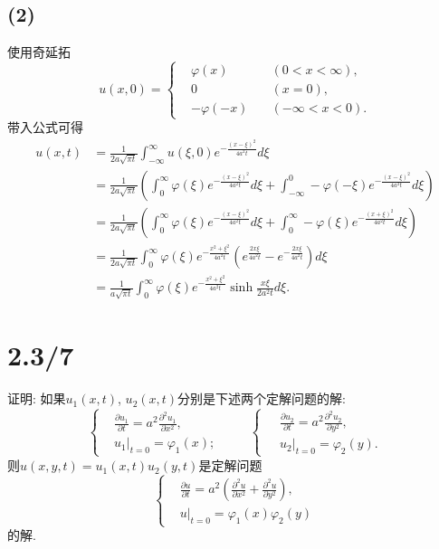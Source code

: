 \documentclass[11pt,a4paper]{article}
\begin{document}
\subsection*{(2)}

使用奇延拓
$$u(x,0)=\left\{\begin{aligned}
     & \varphi(x)   & \quad(0<x<\infty),  \\
     & 0            & \quad (x=0),        \\
     & -\varphi(-x) & \quad(-\infty<x<0).
  \end{aligned}\right.$$
带入公式可得
\begin{align*}
  u(x,t)
   & =\frac{1}{2a\sqrt{\pi t}}\int_{-\infty}^\infty u(\xi,0)e^{-\frac{(x-\xi)^2}{4a^2t}}d\xi                   \\
   & =\frac{1}{2a\sqrt{\pi t}}\left(\int_0^\infty\varphi(\xi)e^{-\frac{(x-\xi)^2}{4a^2t}}d\xi
  +\int_{-\infty}^0-\varphi(-\xi)e^{-\frac{(x-\xi)^2}{4a^2t}}d\xi\right)                                       \\
   & =\frac{1}{2a\sqrt{\pi t}}\left(\int_0^\infty\varphi(\xi)e^{-\frac{(x-\xi)^2}{4a^2t}}d\xi
  +\int_0^\infty-\varphi(\xi)e^{-\frac{(x+\xi)^2}{4a^2t}}d\xi\right)                                           \\
   & =\frac{1}{2a\sqrt{\pi t}}\int_0^\infty\varphi(\xi)e^{-\frac{x^2+\xi^2}{4a^2t}}
  \left(e^{\frac{2x\xi}{4a^2t}}-e^{-\frac{2x\xi}{4a^2t}}\right)d\xi                                            \\
   & =\frac{1}{a\sqrt{\pi t}}\int_0^\infty\varphi(\xi)e^{-\frac{x^2+\xi^2}{4a^2t}}\sinh\frac{x\xi}{2a^2t}d\xi.
\end{align*}

\section{2.3/7}
\begin{problem}
证明: 如果$u_1(x,t)$, $u_2(x,t)$分别是下述两个定解问题的解:
$$\left\{\begin{aligned}
     & \frac{\partial u_1}{\partial t}=a^2\frac{\partial^2u_1}{\partial x^2}, \\
     & u_1|_{t=0}=\varphi_1(x);
  \end{aligned}\qquad\right\{\begin{aligned}
     & \frac{\partial u_2}{\partial t}=a^2\frac{\partial^2u_2}{\partial y^2}, \\
     & u_2|_{t=0}=\varphi_2(y).
  \end{aligned}$$
则$u(x,y,t)=u_1(x,t)u_2(y,t)$是定解问题
$$\left\{\begin{aligned}
     & \frac{\partial u}{\partial t}=a^2\left(\frac{\partial^2u}{\partial x^2}+\frac{\partial^2u}{\partial y^2}\right), \\
     & u|_{t=0}=\varphi_1(x)\varphi_2(y)
  \end{aligned}\right.$$
的解.
\end{problem}
\end{document}

